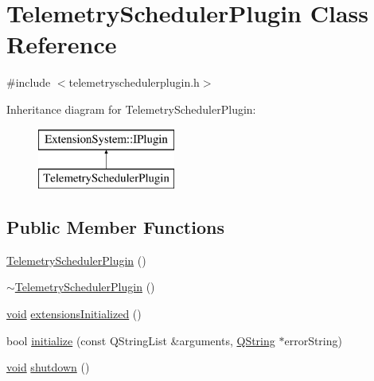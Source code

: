 \hypertarget{class_telemetry_scheduler_plugin}{\section{\-Telemetry\-Scheduler\-Plugin \-Class \-Reference}
\label{class_telemetry_scheduler_plugin}
}


{\ttfamily \#include $<$telemetryschedulerplugin.\-h$>$}

\-Inheritance diagram for \-Telemetry\-Scheduler\-Plugin\-:\begin{figure}[H]
\begin{center}
\leavevmode
\includegraphics[height=2.000000cm]{class_telemetry_scheduler_plugin}
\end{center}
\end{figure}
\subsection*{\-Public \-Member \-Functions}
\begin{DoxyCompactItemize}
\item 
\hyperlink{group___telemetry_scheduler_gadget_plugin_gaef87d8b302add9a71444d750042c064e}{\-Telemetry\-Scheduler\-Plugin} ()
\item 
\hyperlink{group___telemetry_scheduler_gadget_plugin_ga6b915e2f90f8bc7bd7cc71ffefac185b}{$\sim$\-Telemetry\-Scheduler\-Plugin} ()
\item 
\hyperlink{group___u_a_v_objects_plugin_ga444cf2ff3f0ecbe028adce838d373f5c}{void} \hyperlink{group___telemetry_scheduler_gadget_plugin_gad80aeab0cc4afe123338ae4aaac7d9f8}{extensions\-Initialized} ()
\item 
bool \hyperlink{group___telemetry_scheduler_gadget_plugin_gad16a098ff87e686359d43016bba3eed2}{initialize} (const \-Q\-String\-List \&arguments, \hyperlink{group___u_a_v_objects_plugin_gab9d252f49c333c94a72f97ce3105a32d}{\-Q\-String} $\ast$error\-String)
\item 
\hyperlink{group___u_a_v_objects_plugin_ga444cf2ff3f0ecbe028adce838d373f5c}{void} \hyperlink{group___telemetry_scheduler_gadget_plugin_gaee2ae6611062688d3b9c1a883057d399}{shutdown} ()
\end{DoxyCompactItemize}


